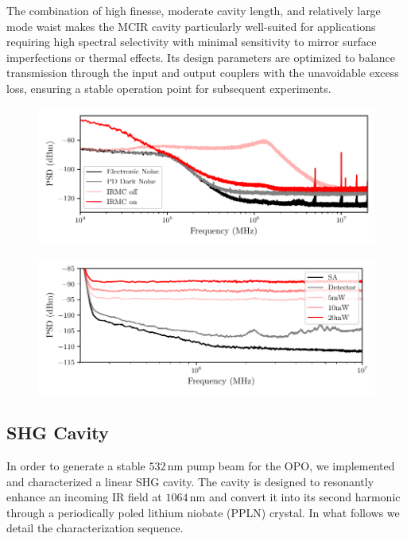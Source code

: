The combination of high finesse, moderate cavity length, and relatively large mode waist makes the MCIR cavity particularly well-suited for 
applications requiring high spectral selectivity with minimal sensitivity to mirror surface imperfections or thermal effects. 
Its design parameters are optimized to balance transmission through the input and output couplers with the unavoidable excess loss, 
ensuring a stable operation point for subsequent experiments.



\begin{figure}[h!]
    \centering  
    \includegraphics[width=\textwidth]{./chap6/fig/NoiseIRMC.pdf}
    \caption{}
    \label{fig:irmcnoise}
\end{figure}

\begin{figure}[h!]
    \centering  
    \includegraphics[width=\textwidth]{./chap6/fig/NoiseLO.pdf}
    \caption{}
    \label{fig:irmcnoise}
\end{figure}


\subsection{SHG Cavity}

In order to generate a stable $532\,\mathrm{nm}$ pump beam for the OPO, we implemented and characterized a linear SHG cavity. The cavity is designed to resonantly enhance an incoming IR field at $1064\,\mathrm{nm}$ and convert it into its second harmonic through a periodically poled lithium niobate (PPLN) crystal. In what follows we detail the characterization sequence.

